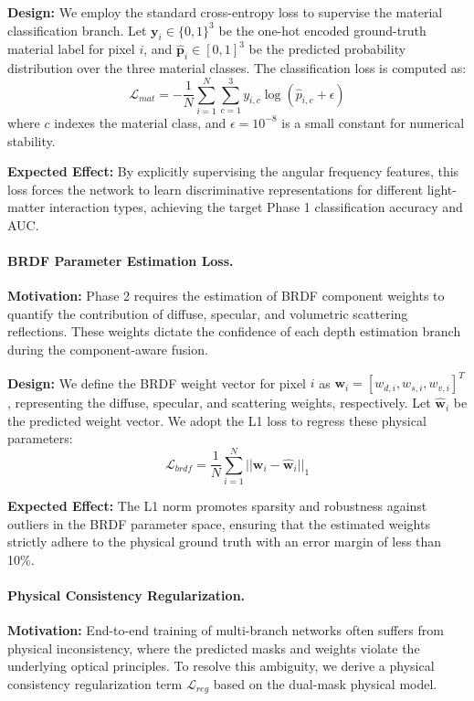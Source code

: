 \documentclass[lettersize,journal]{IEEEtran}
\begin{document}
\textbf{Design:} We employ the standard cross-entropy loss to supervise the material classification branch. Let $\mathbf{y}_i \in \{0, 1\}^3$ be the one-hot encoded ground-truth material label for pixel $i$, and $\hat{\mathbf{p}}_i \in [0, 1]^3$ be the predicted probability distribution over the three material classes. The classification loss is computed as:
\begin{equation}
\label{eq:eq20}
\mathcal{L}_{mat} = -\frac{1}{N} \sum_{i=1}^{N} \sum_{c=1}^{3} y_{i,c} \log(\hat{p}_{i,c} + \epsilon)
\end{equation}
where $c$ indexes the material class, and $\epsilon = 10^{-8}$ is a small constant for numerical stability.

\textbf{Expected Effect:} By explicitly supervising the angular frequency features, this loss forces the network to learn discriminative representations for different light-matter interaction types, achieving the target Phase 1 classification accuracy and AUC.

\paragraph{BRDF Parameter Estimation Loss.}
\textbf{Motivation:} Phase 2 requires the estimation of BRDF component weights to quantify the contribution of diffuse, specular, and volumetric scattering reflections. These weights dictate the confidence of each depth estimation branch during the component-aware fusion.

\textbf{Design:} We define the BRDF weight vector for pixel $i$ as $\mathbf{w}_i = [w_{d,i}, w_{s,i}, w_{v,i}]^T$, representing the diffuse, specular, and scattering weights, respectively. Let $\hat{\mathbf{w}}_i$ be the predicted weight vector. We adopt the L1 loss to regress these physical parameters:
\begin{equation}
\label{eq:eq21}
\mathcal{L}_{brdf} = \frac{1}{N} \sum_{i=1}^{N} || \mathbf{w}_i - \hat{\mathbf{w}}_i ||_1
\end{equation}

\textbf{Expected Effect:} The L1 norm promotes sparsity and robustness against outliers in the BRDF parameter space, ensuring that the estimated weights strictly adhere to the physical ground truth with an error margin of less than 10\%.

\paragraph{Physical Consistency Regularization.}
\textbf{Motivation:} End-to-end training of multi-branch networks often suffers from physical inconsistency, where the predicted masks and weights violate the underlying optical principles. To resolve this ambiguity, we derive a physical consistency regularization term $\mathcal{L}_{reg}$ based on the dual-mask physical model.
\end{document}
